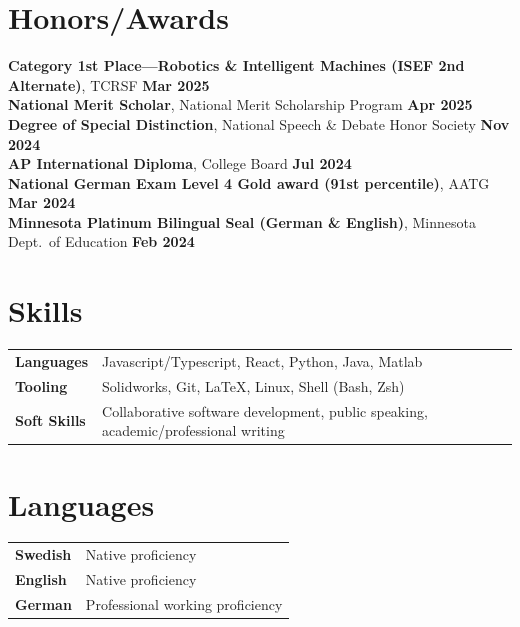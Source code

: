 \documentclass[11pt, letterpaper]{article}
\begin{document}
\vspace{-1em}
\section{\Large{Honors/Awards}}

\textbf{Category 1st Place---Robotics \& Intelligent Machines (ISEF 2nd Alternate)}, TCRSF \hfill \textbf{Mar 2025}\\
\textbf{National Merit Scholar}, National Merit Scholarship Program \hfill \textbf{Apr 2025}\\
\textbf{Degree of Special Distinction}, National Speech \& Debate Honor Society \hfill \textbf{Nov 2024}\\
\textbf{AP International Diploma}, College Board \hfill \textbf{Jul 2024}\\
\textbf{National German Exam Level 4 Gold award (91st percentile)}, AATG \hfill \textbf{Mar 2024}\\
\textbf{Minnesota Platinum Bilingual Seal (German \& English)}, Minnesota Dept.\ of Education \hfill \textbf{Feb 2024}

\vspace{-1em}
\section{\Large{Skills}}

\begin{tabular}{@{}p{2cm}p{15cm}@{}}
\textbf{Languages} & Javascript/Typescript, React, Python, Java, Matlab\\
\textbf{Tooling} & Solidworks, Git, \LaTeX, Linux, Shell (Bash, Zsh)\\
\textbf{Soft Skills} & Collaborative software development, public speaking, academic/professional writing
\end{tabular}

\vspace{-1em}
\section{\Large{Languages}}

\begin{tabular}{@{}p{2cm}p{}@{}}
\textbf{Swedish} & Native proficiency\\
\textbf{English} & Native proficiency\\
\textbf{German} & Professional working proficiency
\end{tabular}

\vspace*{\fill}
\end{document}
